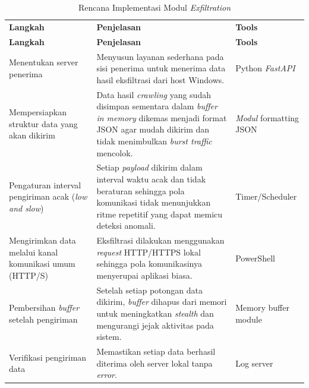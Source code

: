 \begin{longtable}{|p{3.5cm}|p{6cm}|p{3cm}|}
\captionsetup{justification=raggedright, singlelinecheck=false}
\caption{Rencana Implementasi Modul \textit{Exfiltration}} \label{tbl:rencana-exfiltration} \\
\hline
\textbf{Langkah} & \textbf{Penjelasan} & \textbf{Tools} \\
\hline
\endfirsthead

\hline
\textbf{Langkah} & \textbf{Penjelasan} & \textbf{Tools} \\
\hline
\endhead

\hline
\endfoot

Menentukan server penerima &
Menyusun layanan sederhana pada sisi penerima untuk menerima data hasil eksfiltrasi dari host Windows. &
Python \textit{FastAPI} \\
\hline

Mempersiapkan struktur data yang akan dikirim &
Data hasil \textit{crawling} yang sudah disimpan sementara dalam \textit{buffer in memory} dikemas menjadi format JSON agar mudah dikirim dan tidak menimbulkan \textit{burst traffic} mencolok. &
\textit{Modul} formatting JSON \\
\hline

Pengaturan interval pengiriman acak (\textit{low and slow}) &
Setiap \textit{payload} dikirim dalam interval waktu acak dan tidak beraturan sehingga pola komunikasi tidak menunjukkan ritme repetitif yang dapat memicu deteksi anomali. &
Timer/Scheduler \\
\hline

Mengirimkan data melalui kanal komunikasi umum (HTTP/S) &
Eksfiltrasi dilakukan menggunakan \textit{request} HTTP/HTTPS lokal sehingga pola komunikasinya menyerupai aplikasi biasa. &
PowerShell \\
\hline

Pembersihan \textit{buffer} setelah pengiriman &
Setelah setiap potongan data dikirim, \textit{buffer} dihapus dari memori untuk meningkatkan \textit{stealth} dan mengurangi jejak aktivitas pada sistem. &
Memory buffer module \\
\hline

Verifikasi pengiriman data &
Memastikan setiap data berhasil diterima oleh server lokal tanpa \textit{error}. &
Log server \\
\hline

\end{longtable}